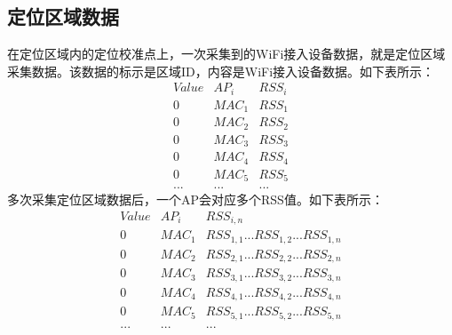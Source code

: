 \documentclass[a4paper, UTF8, twocolumn ]{ctexart}
\begin{document}
\subsection{定位区域数据}
在定位区域内的定位校准点上，一次采集到的WiFi接入设备数据，就是定位区域采集数据。该数据的标示是区域ID，内容是WiFi接入设备数据。如下表所示：
\begin{equation}
  \begin{array}{c|c|c}
    Value & AP_{i} & RSS_{i}\\
    \hline
    0 & MAC_{1} & RSS_{1}\\
    0 & MAC_{2} & RSS_{2}\\
    0 & MAC_{3} & RSS_{3}\\
    0 & MAC_{4} & RSS_{4}\\
    0 & MAC_{5} & RSS_{5}\\
    ... & ... & ...
  \end{array}
\end{equation}
多次采集定位区域数据后，一个AP会对应多个RSS值。如下表所示：
\begin{equation}
  \begin{array}{c|c|c}
    Value & AP_{i} & RSS_{i,n}\\
    \hline
    0 & MAC_{1} & RSS_{1,1} ... RSS_{1,2} ... RSS_{1,n}\\
    0 & MAC_{2} & RSS_{2,1} ... RSS_{2,2} ... RSS_{2,n}\\
    0 & MAC_{3} & RSS_{3,1} ... RSS_{3,2} ... RSS_{3,n}\\
    0 & MAC_{4} & RSS_{4,1} ... RSS_{4,2} ... RSS_{4,n}\\
    0 & MAC_{5} & RSS_{5,1} ... RSS_{5,2} ... RSS_{5,n}\\
    ... & ... & ...
  \end{array}
\end{equation}
\end{document}
